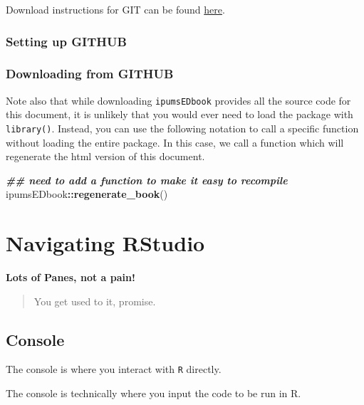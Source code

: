 \documentclass[
]{book}
\newenvironment{Shaded}{\begin{snugshade}}{\end{snugshade}}
\newcommand{\DocumentationTok}[1]{\textcolor[rgb]{0.56,0.35,0.01}{\textbf{\textit{#1}}}}
\newcommand{\FunctionTok}[1]{\textcolor[rgb]{0.13,0.29,0.53}{\textbf{#1}}}
\newcommand{\NormalTok}[1]{#1}
\newcommand{\SpecialCharTok}[1]{\textcolor[rgb]{0.81,0.36,0.00}{\textbf{#1}}}
\begin{document}
Download instructions for GIT can be found \href{https://git-scm.com/downloads}{here}.

\hypertarget{setting-up-github}{%
\subsubsection{Setting up GITHUB}\label{setting-up-github}}

\hypertarget{downloading-from-github}{%
\subsubsection{Downloading from GITHUB}\label{downloading-from-github}}

Note also that while downloading \texttt{ipumsEDbook} provides all the source code for this document, it is unlikely that you would ever need to load the package with \texttt{library()}. Instead, you can use the following notation to call a specific function without loading the entire package. In this case, we call a function which will regenerate the html version of this document.

\begin{Shaded}
\begin{Highlighting}[]
\DocumentationTok{\#\# need to add a function to make it easy to recompile}
\NormalTok{ipumsEDbook}\SpecialCharTok{::}\FunctionTok{regenerate\_book}\NormalTok{()}
\end{Highlighting}
\end{Shaded}

\hypertarget{navigating-rstudio}{%
\section*{Navigating RStudio}\label{navigating-rstudio}}

\textbf{Lots of Panes, not a pain!}

\begin{quote}
You get used to it, promise.
\end{quote}

\hypertarget{console}{%
\subsection{Console}\label{console}}

The console is where you interact with \texttt{R} directly.

The console is technically where you input the code to be run in R.
\end{document}
